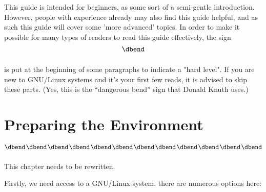 \documentclass{book}
\begin{document}
This guide is intended for beginners, as some sort of a semi-gentle introduction. However, people with experience already may also find this guide helpful, and as such this guide will cover some 'more advanced' topics. In order to make it possible for many types of readers to read this guide effectively, the  sign
$$\vbox{\hbox{\dbend}\vskip 11pt}$$
is put at the beginning of some paragraphs to indicate a "hard level". If you are new to GNU/Linux systems and it's your first few reads, it is advised to skip these parts. (Yes, this is the ``{dangerous bend}'' sign that Donald Knuth uses.)

\tableofcontents

\mainmatter
\chapter{Preparing the Environment}

$$\vcenter{\hbox{\dbend\kern1pt\dbend\kern1pt\dbend\kern1pt\dbend\kern1pt\dbend\kern1pt\dbend\kern1pt\dbend\kern1pt\dbend\kern1pt\dbend\kern1pt\dbend\kern1pt\dbend\kern1pt\dbend}\vskip 11pt}$$
This chapter needs to be rewritten.

Firstly, we need access to a GNU/Linux system, there are numerous options here:
\end{document}
